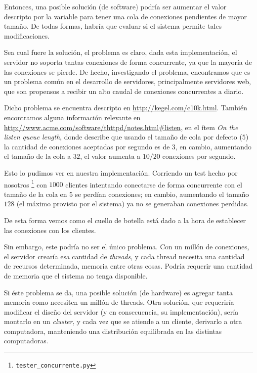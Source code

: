 \documentclass[a4paper]{article}
\begin{document}
Entonces, una posible solución (de software) podría ser aumentar el valor descripto por la variable para tener una cola de conexiones pendientes de mayor tamaño. De todas formas, habría que evaluar si el sistema permite tales  modificaciones.

Sea cual fuere la solución, el problema es claro, dada esta implementación, el servidor no soporta tantas conexiones de forma concurrente, ya que la mayoría de las conexiones se pierde. De hecho, investigando el problema, encontramos que es un problema común en el desarrollo de servidores, principalmente servidores web, que son propensos a recibir un alto caudal de conexiones concurrentes a diario.

Dicho problema se encuentra descripto en \url{http://kegel.com/c10k.html}. También encontramos alguna información relevante en \url{http://www.acme.com/software/thttpd/notes.html#listen}, en el ítem \textit{On the listen queue length}, donde describe que usando el tamaño de cola por defecto ($5$) la cantidad de conexiones aceptadas por segundo es de $3$, en cambio, aumentando el tamaño de la cola a $32$, el valor aumenta a $10/20$ conexiones por segundo.

Esto lo pudimos ver en nuestra implementación. Corriendo un test hecho por nosotros \footnote{\texttt{tester_concurrente.py}} con $1000$ clientes intentando conectarse de forma concurrente con el tamaño de la cola en $5$ se perdían conexiones; en cambio, aumentando el tamaño $128$ (el máximo provisto por el sistema) ya no se generaban conexiones perdidas.

De esta forma vemos como el cuello de botella está dado a la hora de establecer las conexiones con los clientes.

Sin embargo, este podría no ser el único problema. Con un millón de conexiones, el servidor crearía esa cantidad de \textit{threads}, y cada thread necesita una cantidad de recursos determinada, memoria entre otras cosas. Podría requerir una cantidad de memoria que el sistema no tenga disponible.

Si éste problema se da, una posible solución (de hardware) es agregar tanta memoria como necesiten un millón de threads. Otra solución, que requeriría modificar el diseño del servidor (y en consecuencia, su implementación), sería montarlo en un \textit{cluster}, y cada vez que se atiende a un cliente, derivarlo a otra computadora, manteniendo una distribución equilibrada en las distintas computadoras.
\end{document}
